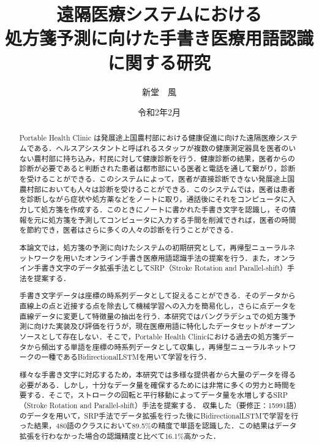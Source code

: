 \documentclass[a4paper,12pt]{jreport}
\title{遠隔医療システムにおける\\処方箋予測に向けた手書き医療用語認識に関する研究}
\author{新堂　風}
\date{令和2年2月}
\begin{document}
\maketitle
\thispagestyle{empty}

\begin{abstract}
 Portable Health Clinic は発展途上国農村部における健康促進に向けた遠隔医療システムである．ヘルスアシスタントと呼ばれるスタッフが複数の健康測定器具を医者のいない農村部に持ち込み，村民に対して健康診断を行う．健康診断の結果，医者からの診断が必要であると判断された患者は都市部にいる医者と電話を通して繋がり，診断を受けることができる．このシステムによって，医者が直接診断できない発展途上国農村部においても人々は診断を受けることができる．このシステムでは，医者は患者を診断しながら症状や処方薬などをノートに取り，通話後にそれをコンピュータに入力して処方箋を作成する．このときにノートに書かれた手書き文字を認識し，その情報を元に処方箋を予測してコンピュータに入力する手間を削減できれば，医者の時間を節約でき，医者はさらに多くの人々の診断を行うことができる．

本論文では，処方箋の予測に向けたシステムの初期研究として，再帰型ニューラルネットワークを用いたオンライン手書き医療用語認識手法の提案を行う．また，オンライン手書き文字のデータ拡張手法としてSRP（Stroke Rotation and Parallel-shift）手法を提案する．

手書き文字データは座標の時系列データとして捉えることができる．そのデータから直線上の点と近接する点を除去して機械学習への入力を簡易化し，さらに点データを直線データに変更して特徴量の抽出を行う．本研究ではバングラデシュでの処方箋予測に向けた実装及び評価を行うが，現在医療用語に特化したデータセットがオープンソースとして存在しない．そこで，Portable Health Clinicにおける過去の処方箋データから頻出する単語を座標の時系列データとして収集し，再帰型ニューラルネットワークの一種であるBidirectionalLSTMを用いて学習を行う．

様々な手書き文字に対応するため，本研究では多様な提供者から大量のデータを得る必要がある．しかし，十分なデータ量を確保するためには非常に多くの労力と時間を要する．そこで，ストロークの回転と平行移動によってデータ量を水増しするSRP（Stroke Rotation and Parallel-shift）手法を提案する．
収集した（要修正：15991語）のデータを用いて，SRP手法でデータ拡張を行った後にBidirectionalLSTMで学習を行った結果，480語のクラスにおいて89.5\%の精度で単語を認識した．この結果はデータ拡張を行わなかった場合の認識精度と比べて16.1\%高かった．
\end{abstract}
\setcounter{page}{0}
\tableofcontents
\end{document}
